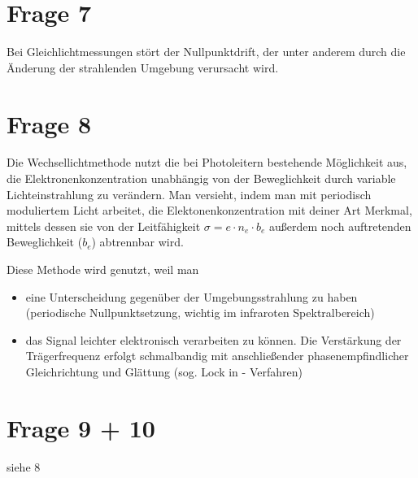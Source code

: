 \section{Frage 7}

Bei Gleichlichtmessungen stört der Nullpunktdrift, der unter anderem durch die Änderung der strahlenden Umgebung verursacht wird.

\section{Frage 8}


Die Wechsellichtmethode nutzt die bei Photoleitern bestehende Möglichkeit aus, die Elektronenkonzentration unabhängig von der Beweglichkeit durch variable Lichteinstrahlung zu verändern. Man versieht, indem man mit periodisch moduliertem Licht arbeitet, die Elektonenkonzentration mit deiner Art Merkmal, mittels dessen sie von der Leitfähigkeit $\sigma = e \cdot n_e \cdot b_e$ außerdem noch auftretenden Beweglichkeit ($b_e$) abtrennbar wird. 

Diese Methode wird genutzt, weil man 

\begin{itemize}
	\item eine Unterscheidung gegenüber der Umgebungsstrahlung zu haben (periodische 
	Nullpunktsetzung, wichtig im infraroten Spektralbereich)
	\item das Signal leichter elektronisch verarbeiten zu können. Die Verstärkung der Trägerfrequenz 
	erfolgt schmalbandig mit anschließender phasenempfindlicher Gleichrichtung und 
	Glättung (sog. Lock in - Verfahren)
\end{itemize}


\section{Frage 9 + 10}

siehe 8







